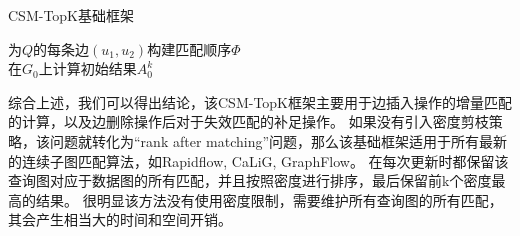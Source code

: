 \begin{algorithm}[h!]
\small
\caption{\label{alg:baseline:framework}CSM-TopK基础框架}
	为$Q$的每条边$(u_1, u_2)$构建匹配顺序$\Phi$ \label{code:build-matching-order} \\
	在$G_0$上计算初始结果$A_0^k$ \label{code:build-initial-topk}\\
\Return
\end{algorithm}

综合上述，我们可以得出结论，该CSM-TopK框架主要用于边插入操作的增量匹配的计算，以及边删除操作后对于失效匹配的补足操作。
如果没有引入密度剪枝策略，该问题就转化为“rank after matching”问题，那么该基础框架适用于所有最新的连续子图匹配算法，如Rapidflow\cite{csm-rapidflow-DBLP:journals/pvldb/SunSHL22}, CaLiG\cite{csm-calig-DBLP:journals/pacmmod/YangZZY23}, GraphFlow\cite{csm-graphflow-DBLP:conf/sigmod/KankanamgeSMCS17}。
在每次更新时都保留该查询图对应于数据图的所有匹配，并且按照密度进行排序，最后保留前k个密度最高的结果。
很明显该方法没有使用密度限制，需要维护所有查询图的所有匹配，其会产生相当大的时间和空间开销。

